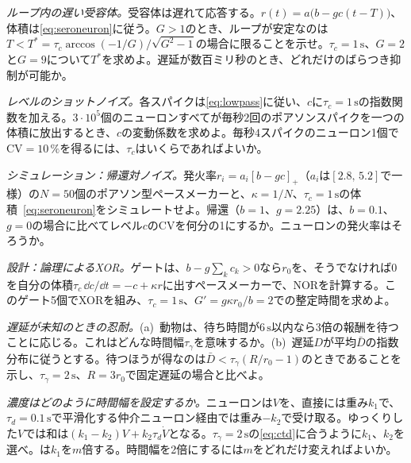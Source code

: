 \begin{exercise}[\lvlB]
\label{ex:05:3}
\emph{ループ内の遅い受容体。}受容体は遅れて応答する。$r(t)=a\bigl(b-gc(t-T)\bigr)$、体積は\eqref{eq:seroneuron}に従う。$G>1$のとき、ループが安定なのは$T<T^*=\tau_c\arccos(-1/G)/\sqrt{G^2-1}$の場合に限ることを示せ。$\tau_c=1\,\text{s}$、$G=2$と$G=9$について$T^*$を求めよ。遅延が数百ミリ秒のとき、どれだけのばらつき抑制が可能か。
\end{exercise}

\begin{exercise}[\lvlB]
\label{ex:05:4}
\emph{レベルのショットノイズ。}各スパイクは\eqref{eq:lowpass}に従い、$c$に$\tau_c=1\,\text{s}$の指数関数を加える。$3\cdot10^5$個のニューロンすべてが毎秒$2$回のポアソンスパイクを一つの体積に放出するとき、$c$の変動係数を求めよ。毎秒$4$スパイクのニューロン1個で$\mathrm{CV}=10\,\%$を得るには、$\tau_c$はいくらであればよいか。
\end{exercise}

\begin{exercise}[\lvlB]
\label{ex:05:5}
\emph{シミュレーション：帰還対ノイズ。}発火率$r_i=a_i[b-gc]_+$（$a_i$は$[2.8,\,5.2]$で一様）の$N=50$個のポアソン型ペースメーカーと、$\kappa=1/N$、$\tau_c=1\,\text{s}$の体積~\eqref{eq:seroneuron}をシミュレートせよ。帰還（$b=1$、$g=2.25$）は、$b=0.1$、$g=0$の場合に比べてレベル$c$のCVを何分の1にするか。ニューロンの発火率はそろうか。
\end{exercise}

\begin{exercise}[\lvlB]
\label{ex:05:6}
\emph{設計：論理によるXOR。}ゲートは、$b-g\sum_kc_k>0$なら$r_0$を、そうでなければ$0$を自分の体積$\tau_c\,\dd c/\dd t=-c+\kappa r$に出すペースメーカーで、NORを計算する。このゲート5個でXORを組み、$\tau_c=1\,\text{s}$、$G'=g\kappa r_0/b=2$での整定時間を求めよ。
\end{exercise}

\begin{exercise}[\lvlB]
\label{ex:05:7}
\emph{遅延が未知のときの忍耐。}(a)~動物は、待ち時間が$6\,\text{s}$以内なら3倍の報酬を待つことに応じる。これはどんな時間幅$\tau_\gamma$を意味するか。(b)~遅延$D$が平均$\bar D$の指数分布に従うとする。待つほうが得なのは$\bar D<\tau_\gamma(R/r_0-1)$のときであることを示し、$\tau_\gamma=2\,\text{s}$、$R=3r_0$で固定遅延の場合と比べよ。
\end{exercise}

\begin{exercise}[\lvlC]
\label{ex:05:8}
\emph{濃度はどのように時間幅を設定するか。}ニューロンは$V$を、直接には重み$k_1$で、$\tau_d=0.1\,\text{s}$で平滑化する仲介ニューロン経由では重み$-k_2$で受け取る。ゆっくりした$V$では和は$(k_1-k_2)V+k_2\tau_d\dot V$となる。$\tau_\gamma=2\,\text{s}$の\eqref{eq:ctd}に合うように$k_1$、$k_2$を選べ。は$k_1$を$m$倍する。時間幅を2倍にするには$m$をどれだけ変えればよいか。
\end{exercise}
